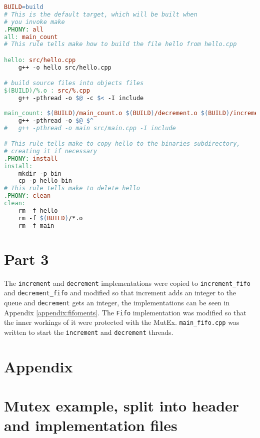 \documentclass{article}
\begin{document}
\begin{lstlisting}[language=makefile, caption={Makefile for compiling Mutex example}]
BUILD=build
# This is the default target, which will be built when 
# you invoke make
.PHONY: all
all: main_count
# This rule tells make how to build the file hello from hello.cpp

hello: src/hello.cpp
	g++ -o hello src/hello.cpp

# build source files into objects files
$(BUILD)/%.o : src/%.cpp
	g++ -pthread -o $@ -c $< -I include
	
main_count: $(BUILD)/main_count.o $(BUILD)/decrement.o $(BUILD)/increment.o
	g++ -pthread -o $@ $^
#	g++ -pthread -o main src/main.cpp -I include

# This rule tells make to copy hello to the binaries subdirectory,
# creating it if necessary
.PHONY: install
install:
	mkdir -p bin
	cp -p hello bin
# This rule tells make to delete hello 
.PHONY: clean 
clean:
	rm -f hello
	rm -f $(BUILD)/*.o
	rm -f main

\end{lstlisting}

\section*{Part 3}
The \verb!increment! and \verb!decrement! implementations were copied to \verb!increment_fifo! and \verb!decrement_fifo! and modified so that increment adds an integer to the queue and \verb!decrement! gets an integer, the implementations can be seen in Appendix \ref{appendix:fifoments}. The \verb!Fifo! implementation was modified so that the inner workings of it were protected with the MutEx.
%
\verb!main_fifo.cpp! was written to start the \verb!increment! and \verb!decrement! threads. 

%

\section*{Appendix}
\appendix
\section{Mutex example, split into header and implementation files}\label{appendix:crements}





\end{document}
